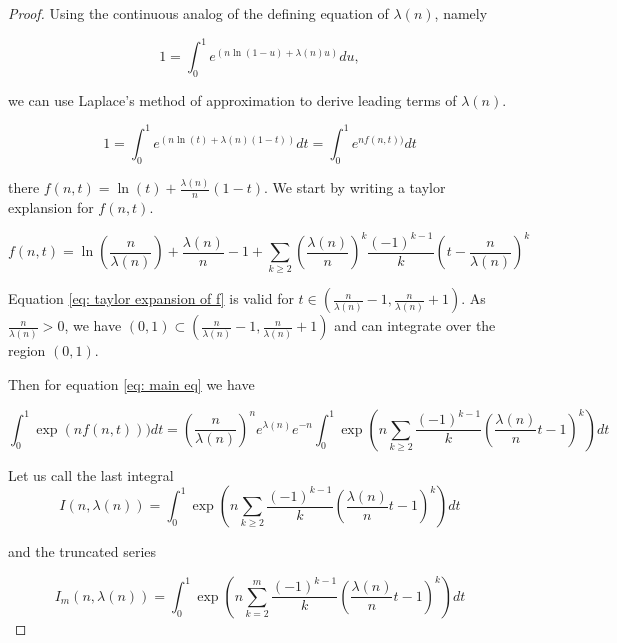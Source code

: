\documentclass[12pt]{article}
\theoremstyle{plain}
\theoremstyle{definition}
\theoremstyle{remark}
\theoremstyle{definition}
\begin{document}
\begin{proof}
Using the continuous analog of the defining equation of $\lambda(n)$, namely
    
    \begin{equation}\label{eq: main relation extended}
        1 = \int_0^1 e^{(n\ln{(1-u)}+\lambda(n)u)} du,
    \end{equation}    

we can use Laplace's method of approximation to derive leading terms of $\lambda(n)$.

\begin{equation}\label{eq: main eq}
    1 = \int_0^1 e^{(n\ln{(t)}+\lambda(n)(1-t))} dt = \int_0^1 e^{nf(n,t))}dt
\end{equation}

there $f(n,t) = \ln{(t)}+\frac{\lambda(n)}{n}(1-t)$. We start by writing a taylor explansion for $f(n,t)$.

\begin{equation}\label{eq: taylor expansion of f}
    f(n,t) = \ln \left(\frac{n}{\lambda(n)}\right) + \frac{\lambda(n)}{n} -1 + \sum_{k \geq 2}\left(\frac{\lambda(n)}{n}\right)^k \frac{(-1)^{k-1}}{k}\left(t-\frac{n}{\lambda(n)}\right)^k
\end{equation}

Equation \ref{eq: taylor expansion of f} is valid for $t \in (\frac{n}{\lambda(n)}-1, \frac{n}{\lambda(n)}+1)$. As $\frac{n}{\lambda(n)} > 0$, we have $(0,1) \subset (\frac{n}{\lambda(n)}-1, \frac{n}{\lambda(n)}+1)$ and can integrate over the region $(0,1)$.

Then for equation \ref{eq: main eq} we have 

\begin{equation}
    \int_0^1 \exp{(nf(n,t)))} dt = \left(\frac{n}{\lambda(n)}\right)^n e^{\lambda(n)}e^{-n}\int_0^1\exp{\left(n\sum_{k\geq2}\frac{(-1)^{k-1}}{k}\left(\frac{\lambda(n)}{n}t-1\right)^k\right)}dt
\end{equation}

Let us call the last integral 
\begin{equation}
    I(n,\lambda(n)) = \int_0^1\exp{\left(n\sum_{k\geq2}\frac{(-1)^{k-1}}{k}\left(\frac{\lambda(n)}{n}t-1\right)^k\right)}dt
\end{equation}

and the truncated series 

\begin{equation}
    I_m(n,\lambda(n)) = \int_0^1\exp{\left(n\sum_{k=2}^m\frac{(-1)^{k-1}}{k}\left(\frac{\lambda(n)}{n}t-1\right)^k\right)}dt
\end{equation}


\end{proof}
\end{document}
